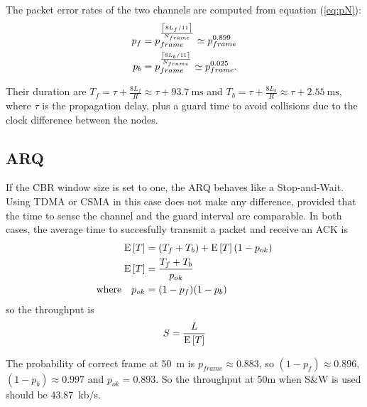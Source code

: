 The packet error rates of the two channels are computed
from equation (\ref{eq:pN}):
\begin{align}
p_f &= p_{frame}^\frac{\left\lceil8 L_f / 11\right\rceil}{N_{frame}} \simeq p_{frame}^{0.899} \\
p_b &= p_{frame}^\frac{\left\lceil8 L_b / 11\right\rceil}{N_{frame}} \simeq p_{frame}^{0.025} .
\end{align}

Their duration are $T_f = \tau + \frac{8L_f}{R} \approx \tau
+ \SI{93.7}{\ms}$ and $T_b = \tau + \frac{8L_b}{R} \approx \tau
+ \SI{2.55}{\ms}$, where $\tau$ is the propagation delay, plus a guard
time to avoid collisions due to the clock difference between the
nodes.

\subsection{ARQ}
If the CBR window size is set to one, the ARQ behaves like a
Stop-and-Wait.
%
Using TDMA or CSMA in this case does not make any
difference, provided that the time to sense the channel and the guard
interval are comparable.
%
In both cases, the average time to succesfully transmit a packet and
receive an ACK is
\begin{align}
\operatorname{E}\left[T\right] &= (T_f + T_b) + \operatorname{E}\left[T\right](1-p_{ok}) \\
\operatorname{E}\left[T\right] &= \frac{T_f + T_b}{p_{ok}} \\
\text{where} \quad p_{ok} &= (1-p_f)(1-p_b)
\end{align}
so the throughput is
\begin{equation}
S = \frac{L}{\operatorname{E}\left[T\right]}
\end{equation}

The probability of correct frame at \SI{50}{\m} is $p_{frame} \approx
0.883$, so $(1-p_f) \approx 0.896$, $(1-p_b) \approx 0.997$ and
$p_{ok} = 0.893$. So the throughput at 50m when S\&W is used should
be \SI{43.87}{kb/s}.
